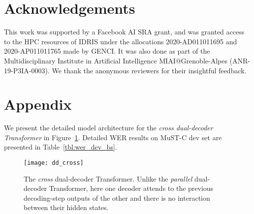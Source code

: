 \documentclass[11pt]{article}
\theoremstyle{plain}
\theoremstyle{definition}
\begin{document}
\section*{Acknowledgements}
{This work was supported by a Facebook AI SRA grant, and was granted access to the HPC resources of IDRIS under the allocations 2020-AD011011695 and 2020-AP011011765 made by GENCI. It was also done as part of the Multidisciplinary Institute in Artificial Intelligence MIAI@Grenoble-Alpes (ANR-19-P3IA-0003). We thank the anonymous reviewers for their insightful feedback.}




\section*{Appendix}

We present the detailed model architecture for the \emph{cross dual-decoder Transformer} in Figure~\ref{fig:dd_cross}. Detailed WER results on MuST-C dev set are presented in Table~\ref{tbl:wer_dev_bs}. 

\begin{figure}[!htb]
    \centering
    \texttt{[image: dd\_cross]}
    \caption{The \emph{cross} dual-decoder Transformer. Unlike the \emph{parallel} dual-decoder Transformer, here one decoder attends to the previous decoding-step outputs of the other and there is no interaction between their hidden states.}
    \label{fig:dd_cross}
\end{figure}
\end{document}
